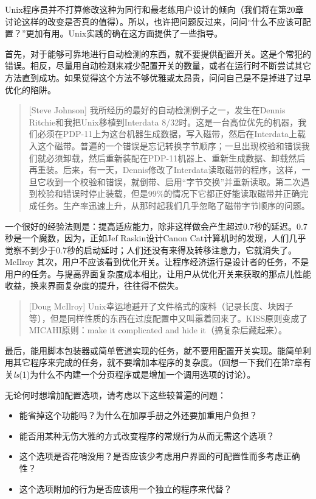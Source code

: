 \documentclass[12pt,oneside]{book}
\begin{document}
Unix程序员并不打算修改这种为同行和最老练用户设计的倾向（我们将在第20章讨论这样的改变是否真的值得）。所以，也许把问题反过来，问问“什么不应该可配置？”更加有用。Unix实践的确在这方面提供了一些指导。

首先，对于能够可靠地进行自动检测的东西，就不要提供配置开关。这是个常犯的错误。相反，尽量用自动检测来减少配置开关的数量，或者在运行时不断尝试其它方法直到成功。如果觉得这个方法不够优雅或太昂贵，问问自己是不是掉进了过早优化的陷阱。

\begin{quote}[Steve Johnson]
我所经历的最好的自动检测例子之一，发生在Dennis Ritchie和我把Unix移植到Interdata 8/32时。这是一台高位优先的机器，我们必须在PDP-11上为这台机器生成数据，写入磁带，然后在Interdata上载入这个磁带。普遍的一个错误是忘记转换字节顺序；一旦出现校验和错误我们就必须卸载，然后重新装配在PDP-11机器上、重新生成数据、卸载然后再重装。后来，有一天，Dennis修改了Interdata读取磁带的程序，这样，一旦它收到一个校验和错误，就倒带、启用“字节交换”并重新读取。第二次遇到校验和错误时停止装载，但是99\%{}的情况下它都正好能读取磁带并正确完成任务。生产率迅速上升，从那时起我们几乎忽略了磁带字节顺序的问题。
\end{quote}

一个很好的经验法则是：提高适应能力，除非这样做会产生超过0.7秒的延迟。0.7秒是一个魔数，因为，正如Jef Raskin设计Canon Cat计算机时的发现，人们几乎觉察不到少于0.7秒的启动延时；人们还没有来得及转移注意力，它就消失了。
McIlroy
其次，用户不应该看到优化开关。让程序经济运行是设计者的任务，不是用户的任务。与提高界面复杂度成本相比，让用户从优化开关来获取的那点儿性能收益，换来界面复杂度的提升，往往得不偿失。
\begin{quote}[Doug McIlroy]
Unix幸运地避开了文件格式的废料（记录长度、块因子等），但是同样性质的东西在过度配置中又叫嚣着回来了。KISS原则变成了MICAHI原则：make it complicated and hide it（搞复杂后藏起来）。
\end{quote}

最后，能用脚本包装器或简单管道实现的任务，就不要用配置开关实现。能简单利用其它程序来完成的任务，就不要增加本程序的复杂度。（回想一下我们在第7章有关\textit{ls}(1)为什么不内建一个分页程序或是增加一个调用选项的讨论）。

无论何时想增加配置选项，请考虑以下这些较普遍的问题：
\begin{itemize}
\item  能省掉这个功能吗？为什么在加厚手册之外还要加重用户负担？
\item  能否用某种无伤大雅的方式改变程序的常规行为从而无需这个选项？
\item  这个选项是否花哨没用？是否应该少考虑用户界面的可配置性而多考虑正确性？
\item  这个选项附加的行为是否应该用一个独立的程序来代替？  
\end{itemize} 
\end{document}
